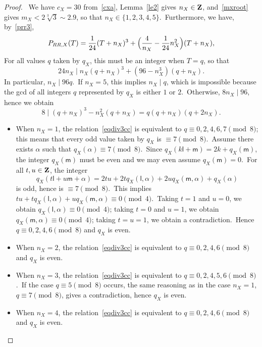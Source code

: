\documentclass[10pt,a4paper]{amsart}
\def\Z{{\bf Z}}
\def\lll{\ensuremath{\mathsf l}}
\def\mm{\ensuremath{\mathsf m}}
\begin{document}
\begin{proof}
\noindent{\bf{Assume  $ q_X(\lll,\mm)=1 $.}}\ We have $c_X=30$ from~\eqref{cxa}, Lemma~\ref{le2} gives $ n_X\in \Z$, and~\eqref{mxroot} gives $m_X<2\sqrt[3]{3}\sim 2.9 $, so that $n_X \in\{1,2,3,4,5\}$.\ Furthermore, we have, by~\eqref{prr3}, 
$$P_{RR,X}(T)=\frac{1}{24}(T+n_X)^3+\Bigl(\frac{4}{n_X}-\frac{1}{24}n_X^2\Bigr)(T+n_X),
$$
 For all values $q$ taken by $q_X$, this must be an integer when $T=q$, so that
\begin{equation*}%
24n_X\mid   n_X(q+n_X)^3+ (96- n_X^3 )(q+n_X).
\end{equation*}
 In particular, $n_X\mid 96 q$.\ If $n_X=5$, this implies $n_X\mid  q$, which is impossible because   the gcd of all integers $q$ represented by $q_X$ is either $1$ or $2$.\ Otherwise, $8n_X\mid 96$, hence we obtain
\begin{equation}\label{eqdiv3cc}
8 \mid  (q+n_X)^3 - n_X^2  (q+n_X)=q(q+n_X)(q+2n_X).
\end{equation}
\begin{itemize}
\item When $n_X=1$, the relation~\eqref{eqdiv3cc} is equivalent to  $q\equiv 0,2,4,6,7\pmod{8}$; this means that every odd value taken by $q_X$ is $\equiv  7\pmod{8}$.\ Assume there exists $\alpha$ such that    $q_X(\alpha)\equiv  7\pmod{8}$.\ Since $q_X(k\lll+\mm)= 2k+q_X(\mm)$, the integer $q_X(\mm)$ must be even and we may even assume $q_X(\mm)=0$.\    For all   $t,u\in\Z$, the integer
$$q_X(t\lll+u\mm+\alpha)=2tu+2tq_X(\lll,\alpha)+2uq_X(\mm,\alpha)+q_X(\alpha)
$$
is odd, hence is $\equiv  7\pmod{8}$.\ This implies $tu+ tq_X(\lll,\alpha)+ uq_X(\mm,\alpha)\equiv 0\pmod4$.\ Taking $t=1$ and $u=0$, we obtain $q_X(\lll,\alpha) \equiv 0\pmod4$; taking $t=0$ and $u=1$, we obtain $q_X(\mm,\alpha) \equiv 0\pmod4$; taking $t=u=1$, we obtain a contradiction.\ Hence $q\equiv 0,2,4,6\pmod{8}$ and $q_X$ is even.\ 
\item When $n_X=2$, the relation~\eqref{eqdiv3cc} is equivalent to  $q\equiv 0,2,4,6\pmod{8}$ and $q_X$ is even.
\item When $n_X=3$, the relation~\eqref{eqdiv3cc} is equivalent to  $q\equiv 0,2,4,5, 6\pmod{8}$.\ If the case $q\equiv 5\pmod{8}$ occurs, the same reasoning as in the case $n_X=1$,  $q\equiv 7\pmod{8}$, gives   a contradiction, hence $q_X$ is even.
\item When $n_X=4$, the relation~\eqref{eqdiv3cc} is equivalent to  $q\equiv 0,2,4,6\pmod{8}$ and $q_X$ is even.
 \end{itemize}

\medskip


\end{proof}
\end{document}
